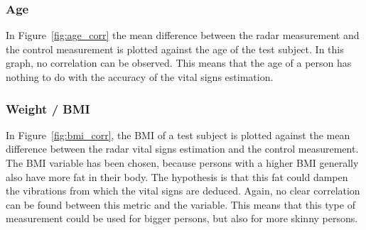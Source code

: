 \subsubsection{Age}
In Figure~\ref{fig:age_corr} the mean difference between the radar measurement and the control measurement is plotted against the age of the test subject. In this graph, no correlation can be observed. This means that the age of a person has nothing to do with the accuracy of the vital signs estimation.

\subsubsection{Weight / BMI}
\label{sec:weight_res}
In Figure~\ref{fig:bmi_corr}, the BMI of a test subject is plotted against the mean difference between the radar vital signs estimation and the control measurement. The BMI variable has been chosen, because persons with a higher BMI generally also have more fat in their body. The hypothesis is that this fat could dampen the vibrations from which the vital signs are deduced. Again, no clear correlation can be found between this metric and the variable. This means that this type of measurement could be used for bigger persons, but also for more skinny persons.

